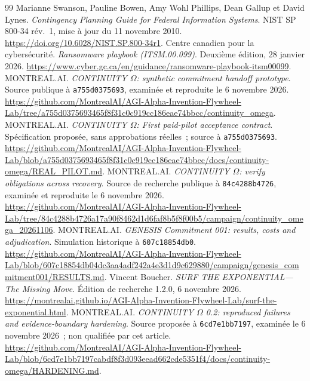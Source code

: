 \documentclass[11pt,a4paper]{article}
\begin{document}
\begin{thebibliography}{99}
 Marianne Swanson, Pauline Bowen, Amy Wohl Phillips, Dean Gallup et David Lynes. \emph{Contingency Planning Guide for Federal Information Systems}. NIST SP 800-34 rév.~1, mise à jour du 11 novembre 2010. \url{https://doi.org/10.6028/NIST.SP.800-34r1}.
 Centre canadien pour la cybersécurité. \emph{Ransomware playbook (ITSM.00.099)}. Deuxième édition, 28 janvier 2026. \url{https://www.cyber.gc.ca/en/guidance/ransomware-playbook-itsm00099}.
 MONTREAL.AI. \emph{CONTINUITY $\Omega$: synthetic commitment handoff prototype}. Source publique à \texttt{a755d0375693}, examinée et reproduite le 6 novembre 2026. \url{https://github.com/MontrealAI/AGI-Alpha-Invention-Flywheel-Lab/tree/a755d0375693465f8f31c0c919cc186eae74bbcc/continuity_omega}.
 MONTREAL.AI. \emph{CONTINUITY $\Omega$: First paid-pilot acceptance contract}. Spécification proposée, sans approbations réelles~; source à \texttt{a755d0375693}. \url{https://github.com/MontrealAI/AGI-Alpha-Invention-Flywheel-Lab/blob/a755d0375693465f8f31c0c919cc186eae74bbcc/docs/continuity-omega/REAL_PILOT.md}.
 MONTREAL.AI. \emph{CONTINUITY $\Omega$: verify obligations across recovery}. Source de recherche publique à \texttt{84c4288b4726}, examinée et reproduite le 6 novembre 2026. \url{https://github.com/MontrealAI/AGI-Alpha-Invention-Flywheel-Lab/tree/84c4288b4726a17a90f8462d1d6faf8b5f8f00b5/campaign/continuity_omega_20261106}.
 MONTREAL.AI. \emph{GENESIS Commitment 001: results, costs and adjudication}. Simulation historique à \texttt{607c18854db0}. \url{https://github.com/MontrealAI/AGI-Alpha-Invention-Flywheel-Lab/blob/607c18854db04dc3aa4adf242a4e3d1d9c629880/campaign/genesis_commitment001/RESULTS.md}.
 Vincent Boucher. \emph{SURF THE EXPONENTIAL---The Missing Move}. Édition de recherche 1.2.0, 6 novembre 2026. \url{https://montrealai.github.io/AGI-Alpha-Invention-Flywheel-Lab/surf-the-exponential.html}.
 MONTREAL.AI. \emph{CONTINUITY $\Omega$ 0.2: reproduced failures and evidence-boundary hardening}. Source proposée à \texttt{6cd7e1bb7197}, examinée le 6 novembre 2026~; non qualifiée par cet article. \url{https://github.com/MontrealAI/AGI-Alpha-Invention-Flywheel-Lab/blob/6cd7e1bb7197cabdf8f3d093eead662cde5351f4/docs/continuity-omega/HARDENING.md}.
\end{thebibliography}
\endgroup
\end{document}
